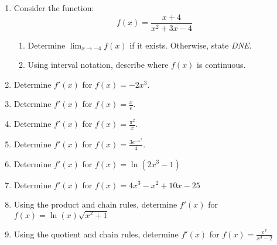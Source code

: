 \documentclass[letterpaper,12pt,fleqn]{article}
\begin{document}
\begin{enumerate}[left=0pt]
\item Consider the function:
  \[f(x)=\frac{x+4}{x^2+3x-4}\]
  \begin{enumerate}
  \item Determine \(\displaystyle\lim_{x\to-4}f(x)\) if it exists.  Otherwise, state \emph{DNE}.

    \vspace{2.5in}

  \item Using interval notation, describe where \(f(x)\) is continuous.
  \end{enumerate}

  \newpage

\item Determine \(f'(x)\) for \(f(x)=-2x^3\).

  \vspace{1in}

\item Determine \(f'(x)\) for \(\displaystyle f(x)=\frac{x}{e}\).

  \vspace{1in}

\item Determine \(f'(x)\) for \(\displaystyle f(x)=\frac{\pi^2}{x}\).

  \vspace{1in}

\item Determine \(f'(x)\) for \(\displaystyle f(x)=\frac{3e^{-x^2}}{4}\).

  \vspace{1in}

\item Determine \(f'(x)\) for \(f(x)=\ln(2x^3-1)\)

  \vspace{1in}

\item Determine \(f'(x)\) for \(f(x)=4x^3-x^2+10x-25\)

  \newpage

\item Using the product and chain rules, determine \(f'(x)\) for \(f(x)=\ln(x)\sqrt{x^2+1}\)

  \vspace{4in}

\item Using the quotient and chain rules, determine \(f'(x)\) for \(f(x)=\frac{e^x}{x^3-2}\)

  \newpage


\end{enumerate}
\end{document}
